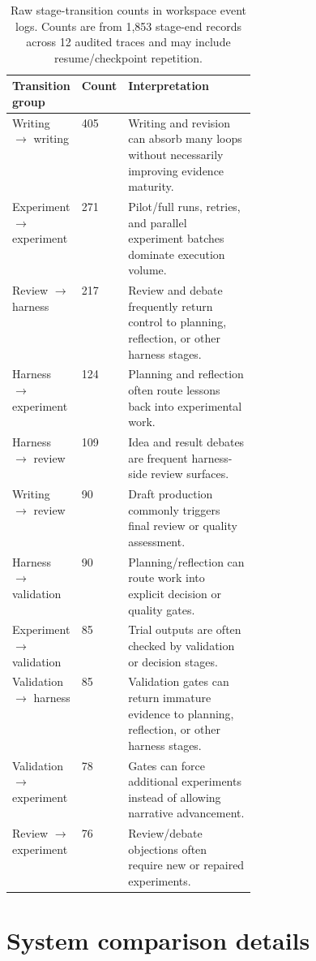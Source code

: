 \documentclass{article}
\begin{document}
\begin{table}[ht]
  \centering
  \small
  \setlength{\tabcolsep}{2pt}
  \caption{Raw stage-transition counts in workspace event logs. Counts are from 1{,}853 stage-end records across 12 audited traces and may include resume/checkpoint repetition.}
  \label{tab:stagetransitions}
  \begin{tabularx}{0.95\linewidth}{p{0.25\linewidth}p{0.10\linewidth}Y}
    \toprule
    Transition group & Count & Interpretation \\
    \midrule
    Writing \(\rightarrow\) writing & 405 & Writing and revision can absorb many loops without necessarily improving evidence maturity. \\
    Experiment \(\rightarrow\) experiment & 271 & Pilot/full runs, retries, and parallel experiment batches dominate execution volume. \\
    Review \(\rightarrow\) harness & 217 & Review and debate frequently return control to planning, reflection, or other harness stages. \\
    Harness \(\rightarrow\) experiment & 124 & Planning and reflection often route lessons back into experimental work. \\
    Harness \(\rightarrow\) review & 109 & Idea and result debates are frequent harness-side review surfaces. \\
    Writing \(\rightarrow\) review & 90 & Draft production commonly triggers final review or quality assessment. \\
    Harness \(\rightarrow\) validation & 90 & Planning/reflection can route work into explicit decision or quality gates. \\
    Experiment \(\rightarrow\) validation & 85 & Trial outputs are often checked by validation or decision stages. \\
    Validation \(\rightarrow\) harness & 85 & Validation gates can return immature evidence to planning, reflection, or other harness stages. \\
    Validation \(\rightarrow\) experiment & 78 & Gates can force additional experiments instead of allowing narrative advancement. \\
    Review \(\rightarrow\) experiment & 76 & Review/debate objections often require new or repaired experiments. \\
    \bottomrule
  \end{tabularx}
\end{table}


\section{System comparison details}
\label{sec:appendix-systemcomparison}
\end{document}
